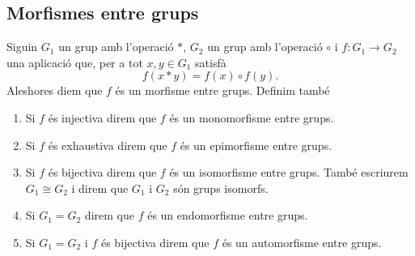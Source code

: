 \documentclass[../../Main.tex]{subfiles}
\begin{document}
	\subsection{Morfismes entre grups}
	\begin{definition}
		\label{def:morfisme entre grups}
		\label{def:monomorfisme entre grups}
		\label{def:epimorfisme entre grups}
		\label{def:isomorfisme entre grups}
		\label{def:endomorfisme entre grups}
		\label{def:automorfisme entre grups}
		Siguin \(G_{1}\) un grup amb l'operació \(\ast\), \(G_{2}\) un grup amb l'operació \(\circ\) i \(f\colon G_{1}\to G_{2}\) una aplicació que, per a tot \(x,y\in G_{1}\) satisfà
		\[f(x\ast y)=f(x)\circ f(y).\]
		Aleshores diem que \(f\) és un morfisme entre grups. Definim també
		\begin{enumerate}
			\item Si \(f\) és injectiva direm que \(f\) és un monomorfisme entre grups.
			\item Si \(f\) és exhaustiva direm que \(f\) és un epimorfisme entre grups.
			\item Si \(f\) és bijectiva direm que \(f\) és un isomorfisme entre grups. També escriurem \(G_{1}\cong G_{2}\) i direm que \(G_{1}\) i \(G_{2}\) són grups isomorfs.
			\item Si \(G_{1}=G_{2}\) direm que \(f\) és un endomorfisme entre grups.
			\item Si \(G_{1}=G_{2}\) i \(f\) és bijectiva direm que \(f\) és un automorfisme entre grups.
		\end{enumerate}
	\end{definition}
\end{document}
